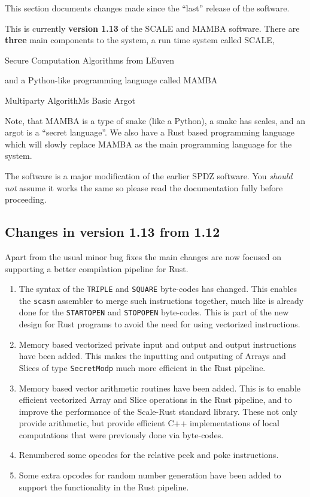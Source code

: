 
This section documents changes made since the ``last'' release of
the software.

\vspace{5mm}

\noindent
This is currently {\bf version 1.13} of the SCALE and MAMBA software.
There are {\bf three} main components to the system, a run time system called
SCALE,
\begin{center}
  Secure Computation Algorithms from LEuven
\end{center}
and a Python-like programming language called MAMBA
\begin{center}
  Multiparty AlgorithMs Basic Argot
\end{center}
Note, that MAMBA is a type of snake (like a Python), a snake
has scales, and an argot is a ``secret language''.
We also have a Rust based programming language which will slowly
replace MAMBA as the main programming language for the system.

\vspace{5mm}

\noindent
The software is a major modification of the earlier SPDZ software.
You {\em should not} assume it works the same so please read
the documentation fully before proceeding.

\subsection{Changes in version 1.13 from 1.12}
Apart from the usual minor bug fixes the main changes
are now focused on supporting a better compilation pipeline
for Rust.
\begin{enumerate}
\item The syntax of the \verb|TRIPLE| and \verb|SQUARE| byte-codes
has changed. This enables the \verb|scasm| assembler to merge
such instructions together, much like is already done for the
\verb|STARTOPEN| and \verb|STOPOPEN| byte-codes. This is part
of the new design for Rust programs to avoid the need for
using vectorized instructions.
\item Memory based vectorized private input and output and output
instructions have been added. This makes the inputting
and outputing of Arrays and Slices of type \verb|SecretModp| much more
efficient in the Rust pipeline.
\item Memory based vector arithmetic routines have been added. This is 
to enable efficient vectorized Array and Slice operations in the Rust pipeline,
and to improve the performance of the Scale-Rust standard library.
These not only provide arithmetic, but provide efficient C++ implementations
of local computations that were previously done via byte-codes.
\item Renumbered some opcodes for the relative peek and poke instructions.
\item Some extra opcodes for random number generation have been added to support the functionality in the Rust pipeline.
\end{enumerate}



